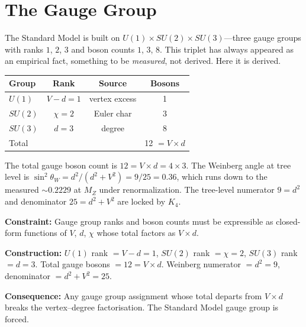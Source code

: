 \documentclass[11pt,a4paper]{book}
\newcommand{\VoidRef}[2]{\textit{#2} (in \textit{Void})}
\begin{document}
\chapter{The Gauge Group}
\label{ch:gauge-group}

The Standard Model is built on $U(1) \times SU(2) \times SU(3)$---three gauge groups with ranks $1$, $2$, $3$ and boson counts $1$, $3$, $8$. This triplet has always appeared as an empirical fact, something to be \emph{measured}, not derived. Here it is derived.

\begin{center}
\begin{tabular}{lccc}
\toprule
Group    & Rank             & Source          & Bosons \\
\midrule
$U(1)$   & $V - d = 1$      & vertex excess   & 1 \\
$SU(2)$  & $\chi = 2$       & Euler char      & 3 \\
$SU(3)$  & $d = 3$          & degree          & 8 \\
\midrule
Total    &                  &                 & 12 $= V \times d$ \\
\bottomrule
\end{tabular}
\end{center}

The total gauge boson count is $12 = V \times d = 4 \times 3$. The Weinberg angle at tree level is $\sin^2\theta_W = d^2/(d^2 + V^2) = 9/25 = 0.36$, which runs down to the measured $\sim 0.2229$ at $M_Z$ under renormalization. The tree-level numerator $9 = d^2$ and denominator $25 = d^2 + V^2$ are locked by $K_4$.


\textbf{Constraint:} Gauge group ranks and boson counts must be expressible as closed-form functions of $V$, $d$, $\chi$ whose total factors as $V \times d$.

\textbf{Construction:} $U(1)$ rank $= V - d = 1$, $SU(2)$ rank $= \chi = 2$, $SU(3)$ rank $= d = 3$. Total gauge bosons $= 12 = V \times d$. Weinberg numerator $= d^2 = 9$, denominator $= d^2 + V^2 = 25$.

\textbf{Consequence:} Any gauge group assignment whose total departs from $V \times d$ breaks the vertex--degree factorisation. The Standard Model gauge group is forced.
\end{document}
